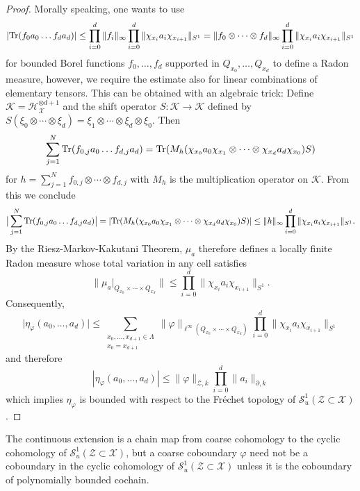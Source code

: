\documentclass[12pt]{amsart}
\newcommand{\Ss}{{\mathcal S}}
\newcommand{\Kk}{{\mathcal K}}
\newcommand{\Hh}{{\mathcal H}}
\newcommand{\Xx}{{\mathcal X}}
\newcommand{\Zz}{{\mathcal Z}}
\newcommand{\Tr}{\mbox{\rm Tr}}
\newcommand{\pdv}{\partial}
\begin{document}
\begin{proof}
Morally speaking, one wants to use $$|\Tr(f_0a_0\dots f_da_d)|\leq \prod_{i=0}^d \|f_i\|_\infty \prod_{i=0}^d
\|\chi_{x_i}a_i\chi_{x_{i+1}}\|_{S^1}= \|f_0\otimes\cdots \otimes f_d\|_\infty \prod_{i=0}^d
\|\chi_{x_i}a_i\chi_{x_{i+1}}\|_{S^1}$$ 
for bounded Borel functions $f_0,\ldots,f_d$ supported in $Q_{x_0},\ldots,Q_{x_d}$ to define a Radon measure, however, we require the estimate also for linear combinations of elementary tensors. This can be obtained with an algebraic trick:
Define $\Kk=\Hh_\Xx^{\otimes d+1}$ and the shift operator $S:\Kk\to \Kk$ defined by $S(\xi_0\otimes\cdots\otimes \xi_d)=\xi_1\otimes\cdots\otimes \xi_d\otimes \xi_0$.
Then
$$\sum_{j=1}^N \Tr(f_{0,j}a_0\dots f_{d,j}a_d)= \Tr(M_h (\chi_{x_0}a_0 \chi_{x_1}\otimes \cdots \otimes \chi_{x_d} a_d \chi_{x_0})S)$$
for $h=\sum_{j=1}^N f_{0,j}\otimes \cdots \otimes f_{d,j}$ with $M_h$ is the multiplication operator on $\Kk$. From this we conclude
$$\big|\sum_{j=1}^N \Tr(f_{0,j}a_0\dots f_{d,j}a_d)\big|= |\Tr(M_h (\chi_{x_0}a_0 \chi_{x_1}\otimes \cdots \otimes \chi_{x_d} a_d \chi_{x_0})S)|\leq \|h\|_\infty  \prod_{i=0}^d
\|\chi_{x_i}a_i\chi_{x_{i+1}}\|_{S^1}.$$
By the Riesz-Markov-Kakutani Theorem, $\mu_a$ therefore defines a locally finite Radon measure whose total variation in any cell satisfies
$$\big\|\mu_a\rvert_{Q_{x_0}\times \cdots \times Q_{x_d}}\|\leq \prod_{i=0}^d
\|\chi_{x_i}a_i\chi_{x_{i+1}}\|_{S^1}.$$
Consequently,
$$\big|\eta_{\varphi}(a_0,\ldots,a_d)\big| \leq \sum_{\substack{x_0,\dots,x_{d+1} \in \Lambda\\ x_0=x_{d+1}}}\|\varphi\|_{\ell^\infty(
Q_{x_0}\times\cdots\times Q_{x_d})}  \prod_{i=0}^d \|\chi_{x_i} a_i \chi_{x_{i+1}}\|_{S^1}$$
and therefore 
$$|\eta_{\varphi}(a_0,\dots,a_d)|\leq \|\varphi\|_{\Zz,k} \prod_{i=0}^d \|a_i\|_{\pdv,k}$$
which implies $\eta_{\varphi}$ is bounded with respect to the Fr\'echet topology of $\Ss_u^1(\Zz\subset \Xx)$. 
\end{proof} The continuous extension is a chain map from coarse cohomology to the cyclic cohomology of $\Ss_u^1(\Zz\subset \Xx)$, but a coarse coboundary $\varphi$ need not be a coboundary in the cyclic cohomology of $\Ss_u^1(\Zz\subset \Xx)$ unless it is the coboundary of polynomially bounded cochain. 
\end{document}
